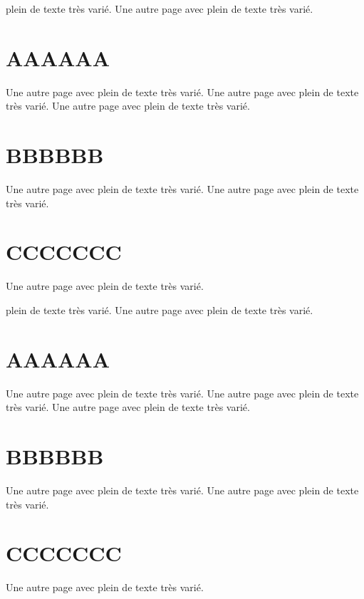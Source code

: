 
    plein de texte très varié.
    Une autre page avec plein de texte très varié.

    \section{AAAAAA}

        Une autre page avec plein de texte très varié.
        Une autre page avec plein de texte très varié.
        Une autre page avec plein de texte très varié.

    \section{BBBBBB}

        Une autre page avec plein de texte très varié.
        Une autre page avec plein de texte très varié.

    \section{CCCCCCC}

        Une autre page avec plein de texte très varié.


    plein de texte très varié.
    Une autre page avec plein de texte très varié.

    \section{AAAAAA}

        Une autre page avec plein de texte très varié.
        Une autre page avec plein de texte très varié.
        Une autre page avec plein de texte très varié.

    \section{BBBBBB}

        Une autre page avec plein de texte très varié.
        Une autre page avec plein de texte très varié.

    \section{CCCCCCC}

        Une autre page avec plein de texte très varié.